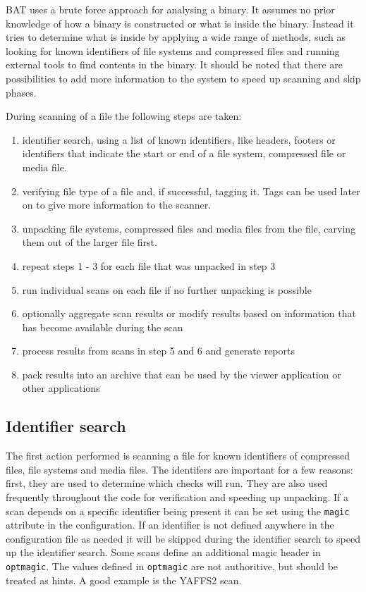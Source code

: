 \documentclass[10pt,a4paper]{article}
\begin{document}
BAT uses a brute force approach for analysing a binary. It assumes no prior
knowledge of how a binary is constructed or what is inside the binary. Instead
it tries to determine what is inside by applying a wide range of methods, such
as looking for known identifiers of file systems and compressed files and
running external tools to find contents in the binary. It should be noted that
there are possibilities to add more information to the system to speed up
scanning and skip phases.

During scanning of a file the following steps are taken:

\begin{enumerate}
\item identifier search, using a list of known identifiers, like headers,
footers or identifiers that indicate the start or end of a file system,
compressed file or media file.
\item verifying file type of a file and, if successful, tagging it. Tags can
be used later on to give more information to the scanner.
\item unpacking file systems, compressed files and media files from the file,
carving them out of the larger file first.
\item repeat steps 1 - 3 for each file that was unpacked in step 3
\item run individual scans on each file if no further unpacking is possible
\item optionally aggregate scan results or modify results based on information
that has become available during the scan
\item process results from scans in step 5 and 6 and generate reports
\item pack results into an archive that can be used by the viewer application
or other applications
\end{enumerate}

\subsection{Identifier search}

The first action performed is scanning a file for known identifiers of
compressed files, file systems and media files. The identifers are important
for a few reasons: first, they are used to determine which checks will run. They
are also used frequently throughout the code for verification and speeding up
unpacking. If a scan depends on a specific identifier being present it can be
set using the \texttt{magic} attribute in the configuration. If an identifier
is not defined anywhere in the configuration file as needed it will be skipped
during the identifier search to speed up the identifier search. Some scans
define an additional magic header in \texttt{optmagic}. The values defined in
\texttt{optmagic} are not authoritive, but should be treated as hints. A good
example is the YAFFS2 scan.
\end{document}
